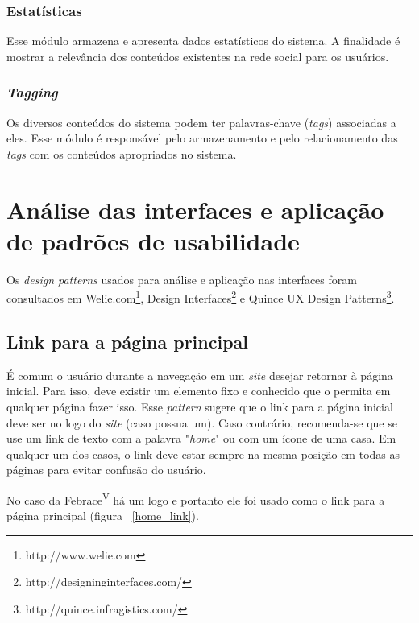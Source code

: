     \subsubsection{Estatísticas}
        Esse módulo armazena e apresenta dados estatísticos do sistema. A finalidade é mostrar a relevância dos conteúdos existentes na rede social para os usuários.

    \subsubsection{\textit{Tagging}}
        Os diversos conteúdos do sistema podem ter palavras-chave (\textit{tags}) associadas a eles. Esse módulo é responsável pelo armazenamento e pelo relacionamento das \textit{tags} com os conteúdos apropriados no sistema. 

\section{Análise das interfaces e aplicação de padrões de usabilidade}

Os \textit{design patterns} usados para análise e aplicação nas interfaces foram consultados em Welie.com\footnote{http://www.welie.com}, Design Interfaces\footnote{http://designinginterfaces.com/} e Quince UX Design Patterns\footnote{http://quince.infragistics.com/}.

\subsection{Link para a página principal}

É comum o usuário durante a navegação em um \textit{site} desejar retornar à página inicial. Para isso, deve existir um elemento fixo e conhecido que o permita em qualquer página fazer isso. Esse \textit{pattern} sugere que o link para a página inicial deve ser no logo do \textit{site} (caso possua um). Caso contrário, recomenda-se que se use um link de texto com a palavra "\textit{home}" ou com um ícone de uma casa. Em qualquer um dos casos, o link deve estar sempre na mesma posição em todas as páginas para evitar confusão do usuário.

No caso da Febrace\textsuperscript{V} há um logo e portanto ele foi usado como o link para a página principal (figura ~\ref{home_link}).

